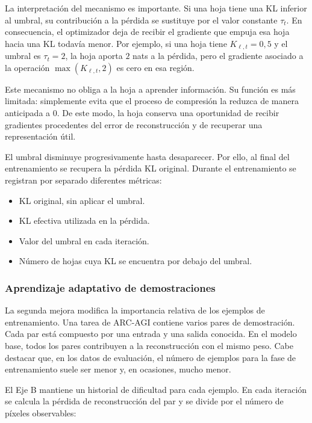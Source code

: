 \documentclass[11pt,a4paper,spanish]{book}
\numberwithin{equation}{chapter}
\numberwithin{figure}{chapter}
\begin{document}
La interpretación del mecanismo es importante. Si una hoja tiene una KL inferior al umbral, su contribución a la pérdida se sustituye por el valor
constante \(\tau_t\). En consecuencia, el optimizador deja de recibir el gradiente que empuja esa hoja hacia una KL todavía menor. Por ejemplo, si una
hoja tiene \(K_{\ell,t}=0{,}5\) y el umbral es \(\tau_t=2\), la hoja aporta \(2\) nats a la pérdida, pero el gradiente asociado a la operación
\(\max(K_{\ell,t},2)\) es cero en esa región.

Este mecanismo no obliga a la hoja a aprender información. Su función es más limitada: simplemente evita que el proceso de compresión la
reduzca de manera anticipada a 0. De este modo, la hoja conserva una oportunidad de recibir gradientes procedentes del error de reconstrucción y de recuperar una
representación útil.

El umbral disminuye progresivamente hasta desaparecer. Por ello, al final del
entrenamiento se recupera la pérdida KL original. Durante el entrenamiento se registran por separado diferentes métricas:

\begin{itemize}
    \item KL original, sin aplicar el umbral.
    \item KL efectiva utilizada en la pérdida.
    \item Valor del umbral en cada iteración.
    \item Número de hojas cuya KL se encuentra por debajo del umbral.
\end{itemize}

\subsubsection{Aprendizaje adaptativo de demostraciones}

La segunda mejora modifica la importancia relativa de los ejemplos de entrenamiento. Una tarea de ARC-AGI contiene varios pares de demostración. Cada
par está compuesto por una entrada y una salida conocida. En el modelo base, todos los pares contribuyen a la reconstrucción con el mismo peso.
Cabe destacar que, en los datos de evaluación, el número de ejemplos para la fase de entrenamiento suele ser menor y, en ocasiones, mucho menor.

El Eje B mantiene un historial de dificultad para cada ejemplo. En cada iteración se calcula la pérdida de reconstrucción del par y se divide por el
número de píxeles observables:
\end{document}
